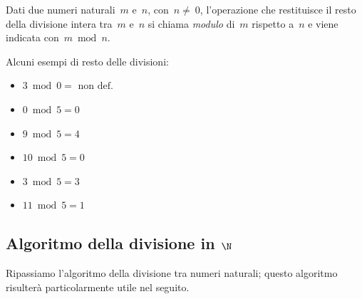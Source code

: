 \begin{definizione}{}{}
Dati due numeri naturali~\(m\) e~\(n\), con~\(n\neq~0\), l'operazione che 
restituisce il resto della divisione intera tra~\(m\) e~\(n\) si chiama 
\emph{modulo} di~\(m\) rispetto a~\(n\) e viene indicata con~\(m\bmod{n}\).
\end{definizione}


\begin{esempio}{}{}
Alcuni esempi di resto delle divisioni:
\vspace{-1em}
\begin{multicols}{3}
\begin{itemize} [nosep]
\item \(3 \bmod 0 = \text{ non def.}\)
\item \(0 \bmod 5 = 0\)
\item \(9 \bmod 5 = 4\)
\item \(10 \bmod 5 = 0\)
\item \(3 \bmod 5 = 3\)
\item \(11 \bmod 5 = 1\)
\end{itemize}
\end{multicols}
\end{esempio}


\subsection{Algoritmo della divisione in $\N$}

Ripassiamo l'algoritmo della divisione tra numeri naturali; 
questo algoritmo risulterà particolarmente utile nel seguito.

\vspace{-6pt}
\begin{center}
\begin{inaccessibleblock}
\divinta
% 
\end{inaccessibleblock}
\end{center}
\vspace{-12pt}

